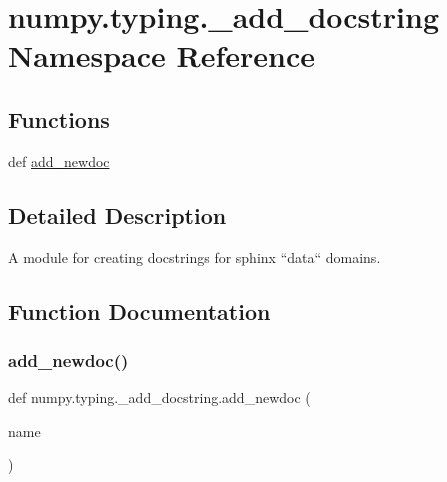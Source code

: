 \hypertarget{namespacenumpy_1_1typing_1_1__add__docstring}{}\section{numpy.\+typing.\+\_\+add\+\_\+docstring Namespace Reference}
\label{namespacenumpy_1_1typing_1_1__add__docstring}
\subsection*{Functions}
\begin{DoxyCompactItemize}
\item 
def \hyperlink{namespacenumpy_1_1typing_1_1__add__docstring_a0b39608df8dcfce571d9d6f6c4ef1d87}{add\+\_\+newdoc}
\end{DoxyCompactItemize}


\subsection{Detailed Description}
\begin{DoxyVerb}A module for creating docstrings for sphinx ``data`` domains.\end{DoxyVerb}
 

\subsection{Function Documentation}
\mbox{\label{namespacenumpy_1_1typing_1_1__add__docstring_a0b39608df8dcfce571d9d6f6c4ef1d87}} 
\subsubsection{\texorpdfstring{add\+\_\+newdoc()}{add\_newdoc()}}
{\footnotesize\ttfamily def numpy.\+typing.\+\_\+add\+\_\+docstring.\+add\+\_\+newdoc (\begin{DoxyParamCaption}\item[{}]{name }\end{DoxyParamCaption})}

